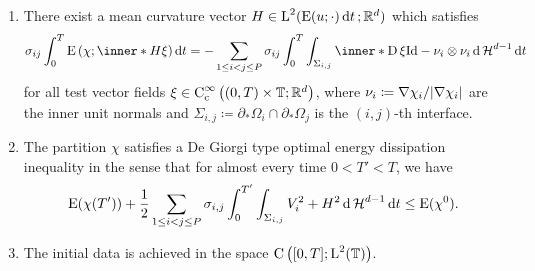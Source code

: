 \begin{definition}
\begin{enumerate}
		\item 
		There exist a mean curvature vector $ H \in 
		\operatorname{L}^{ 2 } ( \operatorname{E} ( u ; \cdot) \dd{ t } ; \mathbb{ R }^{ d } ) $ 
		which satisfies
		\begin{equation}
			\label{mean_curvature_vector_bv_de_giorgi}
			\sigma_{ i j }
			\int_{ 0 }^{ T }
				\energy \left( \chi ; \inner*{ H }{ \xi } \right)
			\dd{ t }
			=
			-
			\sum_{ 1 \leq i < j \leq P }
			\sigma_{ i j }
			\int_{ 0 }^{ T }
				\int_{ \Sigma_{ i , j } }
					\inner*{
						\diff \xi }
					{ \mathrm{Id} - \nu_{ i } \otimes \nu_{ i } }
				\dd{ \hm^{ d - 1 } }
			\dd{ t }
		\end{equation}
		for all test vector fields 
		$ \xi \in \operatorname{C}_{ \mathrm{c} }^{ \infty } \left(
			( 0 , T ) \times \operatorname{\mathbb{T}} ; \mathbb{ R }^{ d }
		\right) $,
		where $ \nu_{ i } \coloneqq \nabla \chi_{ i } / \abs{ \nabla \chi_{ i } 
		} $ are the inner unit normals and $ \Sigma_{ i , j } \coloneqq 
		\partial_{ \ast } \Omega_{ i } \cap \partial_{ \ast } \Omega_{ j } $
		is the $ (i, j )$-th interface.
		
		\item 
		The partition $ \chi $ satisfies a De Giorgi type optimal energy 
		dissipation inequality in the sense that for almost every time $ 0 < T' 
		< T $, we have
		\begin{equation*}
			\operatorname{E} ( \chi ( T' ) )
			+
			\frac{ 1 }{ 2 }
			\sum_{ 1 \leq i < j \leq P }
				\sigma_{ i , j }
				\int_{ 0 }^{ T' }
					\int_{ \Sigma_{ i , j } }
						V_{ i }^{ 2 }
						+
						H^{ 2 }
					\dd{ \operatorname{\mathcal{H}}^{ d - 1 } }
				\dd{ t }
			\leq
			\operatorname{E} ( \chi^{ 0 } ).
		\end{equation*}
		
		\item
		The initial data is achieved in the space $ \operatorname{C} \left( [ 0 , T ] ; 
		\operatorname{L}^{ 2 } ( \operatorname{\mathbb{T}} ) \right) $.
	\end{enumerate}
\end{definition}

